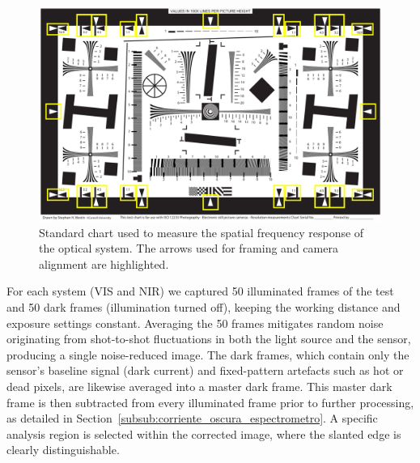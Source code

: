 \begin{figure}[H]
    \centering
    \includegraphics[width=0.8\linewidth]{Figures/C3/ISO_12233-reschart_arrows.png}
    \caption{Standard chart used to measure the spatial frequency response of the optical system. The arrows used for framing and camera alignment are highlighted.}
    \label{fig:iso12233_test_chart_encuadre}
\end{figure}


\noindent For each system (VIS and NIR) we captured 50 illuminated frames of the test and 50 dark frames (illumination turned off), keeping the working distance and exposure settings constant. Averaging the 50 frames mitigates random noise originating from shot-to-shot fluctuations in both the light source and the sensor, producing a single noise-reduced image.  
The dark frames, which contain only the sensor’s baseline signal (dark current) and fixed-pattern artefacts such as hot or dead pixels, are likewise averaged into a master dark frame.  
This master dark frame is then subtracted from every illuminated frame prior to further processing, as detailed in Section~\ref{subsub:corriente_oscura_espectrometro}. A specific analysis region is selected within the corrected image, where the slanted edge is clearly distinguishable.\\



    

